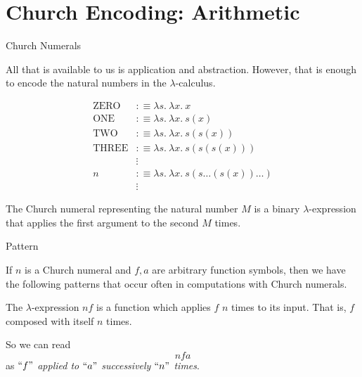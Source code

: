 \documentclass{beamer}
\begin{document}
\section{Church Encoding: Arithmetic}

\begin{frame}{Church Numerals}

    All that is available to us is application and abstraction. However, that is enough to encode the natural numbers in the $\lambda$-calculus. 
    
    \begin{align*}
        \text{ZERO} &:\equiv \lambda s. \ \lambda x. \ x \\
        \text{ONE} &:\equiv \lambda s. \ \lambda x. \ s(x) \\
        \text{TWO} &:\equiv \lambda s. \ \lambda x. \ s(s(x)) \\
        \text{THREE} &:\equiv \lambda s. \ \lambda x. \ s(s(s(x))) \\
        &\vdots \\
        n &:\equiv \lambda s. \ \lambda x. \ s(s \dots (s(x)) \dots ) \\
        &\vdots
    \end{align*}
        
    The Church numeral representing the natural number $M$ is a binary $\lambda$-expression that applies the first argument to the second $M$ times.    

\end{frame}

\begin{frame}{Pattern}

    If $n$ is a Church numeral and $f,a$ are arbitrary function symbols, then we have the following patterns that occur often in computations with Church numerals. 
    
    \vspace{0.3cm}
    
    The $\lambda$-expression $nf$ is a function which applies $f$ $n$ times to its input. That is, $f$ composed with itself $n$ times. 
    
    \vspace{0.3cm}
    
    So we can read $$nfa$$ as \emph{$``f"$ applied to $``a"$ successively $``n"$ times}.
    
\end{frame}
\end{document}

